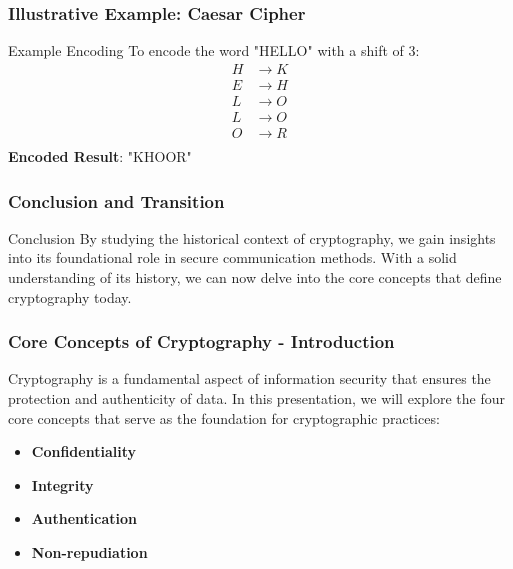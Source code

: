 \documentclass{beamer}
\begin{document}
\begin{frame}[fragile]
    \frametitle{Illustrative Example: Caesar Cipher}
    \begin{block}{Example Encoding}
        To encode the word "HELLO" with a shift of 3:
        \begin{align*}
            H & \to K \\
            E & \to H \\
            L & \to O \\
            L & \to O \\
            O & \to R \\
        \end{align*}
        \textbf{Encoded Result}: "KHOOR"
    \end{block}
\end{frame}

\begin{frame}[fragile]
    \frametitle{Conclusion and Transition}
    \begin{block}{Conclusion}
        By studying the historical context of cryptography, we gain insights into its foundational role in secure communication methods.
        With a solid understanding of its history, we can now delve into the core concepts that define cryptography today.
    \end{block}
\end{frame}

\begin{frame}[fragile]
    \frametitle{Core Concepts of Cryptography - Introduction}
    Cryptography is a fundamental aspect of information security that ensures the protection and authenticity of data. 
    In this presentation, we will explore the four core concepts that serve as the foundation for cryptographic practices:
    \begin{itemize}
        \item \textbf{Confidentiality}
        \item \textbf{Integrity}
        \item \textbf{Authentication}
        \item \textbf{Non-repudiation}
    \end{itemize}
\end{frame}
\end{document}
